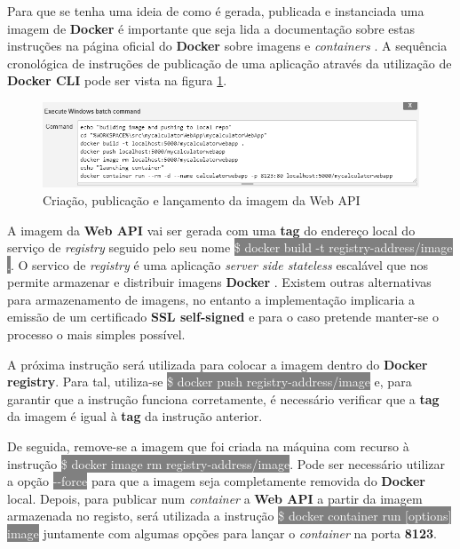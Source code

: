 \hspace{1cm}Para que se tenha uma ideia de como é gerada, publicada e instanciada uma imagem de \textbf{Docker} é importante que seja lida a documentação sobre estas instruções na página oficial do \textbf{Docker} sobre imagens \cite{dockerimages} e \textit{containers} \cite{dockercontainers}. A sequência cronológica de instruções de publicação de uma aplicação através da utilização de \textbf{Docker CLI} pode ser vista na figura \ref{Fig:Fig74}.

\begin{figure}[hbt!]
\centering
\includegraphics[width=0.9\linewidth]{Cap5/JenkinsGenerateDockerImage.png}
\caption{Criação, publicação e lançamento da imagem da Web API}
\label{Fig:Fig74}
\end{figure}

A imagem da \textbf{Web API} vai ser gerada com uma \textbf{tag} do endereço local do serviço de \textit{registry} seguido pelo seu nome \colorbox{gray}{\textcolor{white}{\$ docker build -t registry-address/image .}}. O servico de \textit{registry} é uma aplicação \textit{server side stateless} escalável que nos permite armazenar e distribuir imagens \textbf{Docker} \cite{dockerregistry}. Existem outras alternativas para armazenamento de imagens, no entanto a implementação implicaria a emissão de um certificado \textbf{SSL self-signed} e para o caso pretende manter-se o processo o mais simples possível.

A próxima instrução será utilizada para colocar a imagem dentro do \textbf{Docker registry}. Para tal, utiliza-se \colorbox{gray}{\textcolor{white}{\$ docker push registry-address/image}} e, para garantir que a instrução funciona corretamente, é necessário verificar que a \textbf{tag} da imagem é igual à \textbf{tag} da instrução anterior. 

De seguida, remove-se a imagem que foi criada na máquina com recurso à instrução \colorbox{gray}{\textcolor{white}{\$ docker image rm registry-address/image}}. Pode ser necessário utilizar a opção \colorbox{gray}{\textcolor{white}{-{}-force}} para que a imagem seja completamente removida do \textbf{Docker} local. Depois, para publicar num \textit{container} a \textbf{Web API} a partir da imagem armazenada no registo, será utilizada a instrução \colorbox{gray}{\textcolor{white}{\$ docker container run [options] image}} juntamente com algumas opções para lançar o \textit{container} na porta \textbf{8123}.

